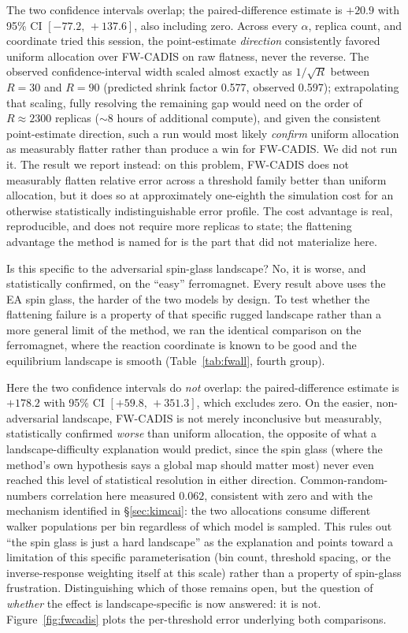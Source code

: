 \documentclass[11pt]{article}
\begin{document}
	The two confidence intervals overlap; the paired-difference estimate is $+20.9$ with 95\%
	CI $[-77.2,\,+137.6]$, also including zero. Across every $\alpha$, replica count, and
	coordinate tried this session, the point-estimate \emph{direction} consistently favored
	uniform allocation over FW-CADIS on raw flatness, never the reverse. The observed
	confidence-interval width scaled almost exactly as $1/\sqrt{R}$ between $R=30$ and $R=90$
	(predicted shrink factor 0.577, observed 0.597); extrapolating that scaling, fully resolving
	the remaining gap would need on the order of $R\approx2300$ replicas ($\sim$8 hours of
	additional compute), and given the consistent point-estimate direction, such a run would
	most likely \emph{confirm} uniform allocation as measurably flatter rather than produce a
	win for FW-CADIS. We did not run it. The result we report instead: on this problem,
		FW-CADIS does not measurably flatten relative error across a threshold family better than
		uniform allocation, but it does so at approximately one-eighth the simulation cost for an
		otherwise statistically indistinguishable error profile. The cost advantage is real,
	reproducible, and does not require more replicas to state; the flattening advantage the
	method is named for is the part that did not materialize here.
	
	Is this specific to the adversarial spin-glass landscape? No, it is worse, and
		statistically confirmed, on the ``easy'' ferromagnet. Every result above uses the EA spin
	glass, the harder of the two models by design. To test whether the flattening failure is a
	property of that specific rugged landscape rather than a more general limit of the method,
	we ran the identical comparison on the ferromagnet, where the reaction coordinate is known
	to be good and the equilibrium landscape is smooth (Table~\ref{tab:fwall}, fourth group).

	Here the two confidence intervals do \emph{not} overlap: the paired-difference estimate is
	$+178.2$ with 95\% CI $[+59.8,\,+351.3]$, which excludes zero. On the easier,
		non-adversarial landscape, FW-CADIS is not merely inconclusive but measurably, statistically
		confirmed \emph{worse} than uniform allocation, the opposite of what a
	landscape-difficulty explanation would predict, since the spin glass (where the method's
	own hypothesis says a global map should matter most) never even reached this level of
	statistical resolution in either direction. Common-random-numbers correlation here measured
	$0.062$, consistent with zero and with the mechanism identified in \S\ref{sec:kimcai}: the
	two allocations consume different walker populations per bin regardless of which model is
	sampled. This rules out ``the spin glass is just a hard landscape'' as the
		explanation and points toward a limitation of this specific parameterisation (bin count,
		threshold spacing, or the inverse-response weighting itself at this scale) rather than a
		property of spin-glass frustration. Distinguishing which of those remains open, but the
	question of \emph{whether} the effect is landscape-specific is now answered: it is not.
	Figure~\ref{fig:fwcadis} plots the per-threshold error underlying both comparisons.
\end{document}
